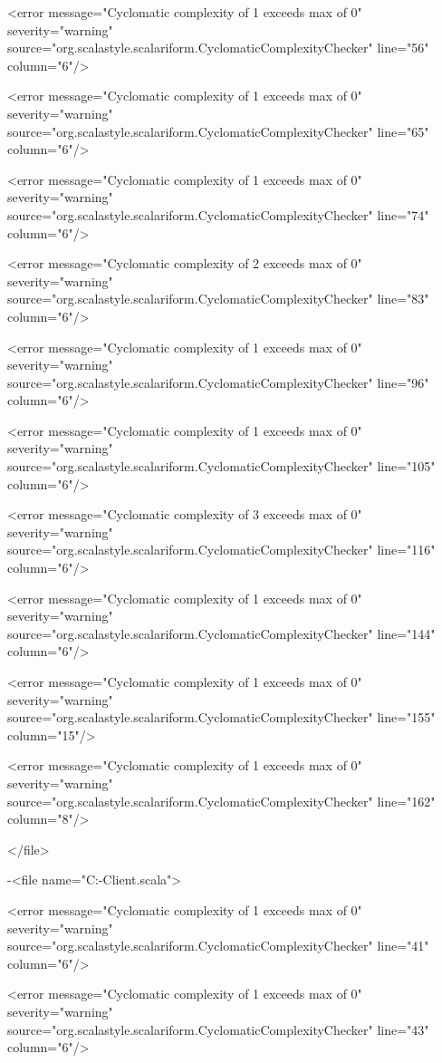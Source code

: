 \documentclass{scalatekids-article}
\begin{document}
<error message="Cyclomatic complexity of 1 exceeds max of 0" severity="warning" source="org.scalastyle.scalariform.CyclomaticComplexityChecker" line="56" column="6"/>

<error message="Cyclomatic complexity of 1 exceeds max of 0" severity="warning" source="org.scalastyle.scalariform.CyclomaticComplexityChecker" line="65" column="6"/>

<error message="Cyclomatic complexity of 1 exceeds max of 0" severity="warning" source="org.scalastyle.scalariform.CyclomaticComplexityChecker" line="74" column="6"/>

<error message="Cyclomatic complexity of 2 exceeds max of 0" severity="warning" source="org.scalastyle.scalariform.CyclomaticComplexityChecker" line="83" column="6"/>

<error message="Cyclomatic complexity of 1 exceeds max of 0" severity="warning" source="org.scalastyle.scalariform.CyclomaticComplexityChecker" line="96" column="6"/>

<error message="Cyclomatic complexity of 1 exceeds max of 0" severity="warning" source="org.scalastyle.scalariform.CyclomaticComplexityChecker" line="105" column="6"/>

<error message="Cyclomatic complexity of 3 exceeds max of 0" severity="warning" source="org.scalastyle.scalariform.CyclomaticComplexityChecker" line="116" column="6"/>

<error message="Cyclomatic complexity of 1 exceeds max of 0" severity="warning" source="org.scalastyle.scalariform.CyclomaticComplexityChecker" line="144" column="6"/>

<error message="Cyclomatic complexity of 1 exceeds max of 0" severity="warning" source="org.scalastyle.scalariform.CyclomaticComplexityChecker" line="155" column="15"/>

<error message="Cyclomatic complexity of 1 exceeds max of 0" severity="warning" source="org.scalastyle.scalariform.CyclomaticComplexityChecker" line="162" column="8"/>

</file>


-<file name="C:\Users\Davide\Documents\GitHub\Actorbase-Client\src\main\scala\com\actorbase\driver\ActorbaseDriver.scala">

<error message="Cyclomatic complexity of 1 exceeds max of 0" severity="warning" source="org.scalastyle.scalariform.CyclomaticComplexityChecker" line="41" column="6"/>

<error message="Cyclomatic complexity of 1 exceeds max of 0" severity="warning" source="org.scalastyle.scalariform.CyclomaticComplexityChecker" line="43" column="6"/>
\end{document}
